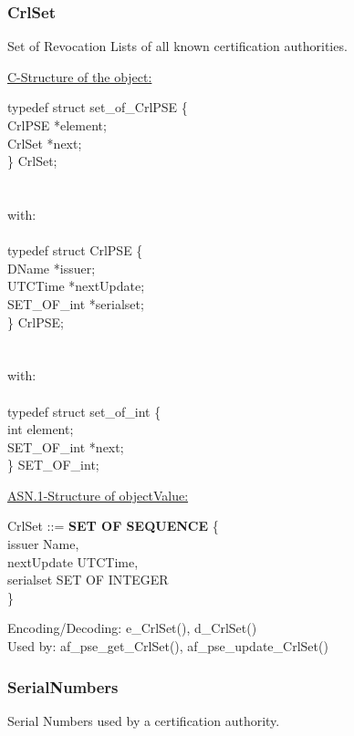 \subsubsection{CrlSet}
Set of Revocation Lists of all known certification authorities.
 
\underline{C-Structure of the object:}

{\small
\bvtab
\4      typedef struct set\_of\_CrlPSE \{ \\
\6              CrlPSE   \3 *element; \\
\6              CrlSet   \3 *next; \\
\4      \} CrlSet; \\ \\ \\
with: \\ \\
\4      typedef struct CrlPSE \{ \\
\6              DName          \3 *issuer; \\
\6              UTCTime        \3 *nextUpdate; \\
\6              SET\_OF\_int     \3 *serialset; \\
\4      \} CrlPSE;  \\ \\ \\
with: \\ \\
\4      typedef struct set\_of\_int \{ \\
\6              int          \3 element; \\
\6              SET\_OF\_int \3 *next; \\
\4      \} SET\_OF\_int;  \\
\evtab
}


\underline{ASN.1-Structure of objectValue:}

{\small
\bvtab
\3 CrlSet ::= \3 {\bf SET OF SEQUENCE} \{  \\
\7 issuer          \3 Name,                    \\
\7 nextUpdate      \3 UTCTime,                \\
\7 serialset       \3 SET OF INTEGER          \\
\6 \}
\evtab
}
 
Encoding/Decoding: e\_CrlSet(), d\_CrlSet() \\
Used by: af\_pse\_get\_CrlSet(), af\_pse\_update\_CrlSet()


\subsubsection{SerialNumbers}
Serial Numbers used by a certification authority.
 
